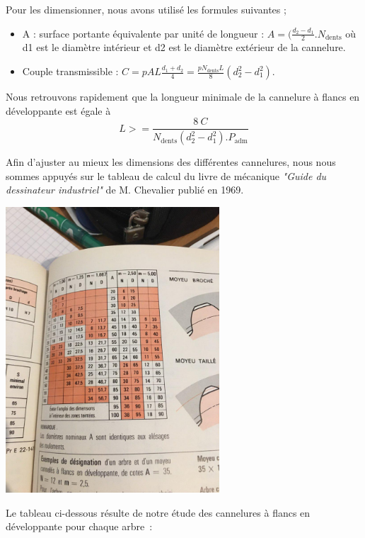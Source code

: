 \documentclass{config}
\begin{document}
\begin{spacing}{1.2}
Pour les dimensionner, nous avons utilisé les formules suivantes ;
\begin{itemize}
    \item A : surface portante équivalente par unité de longueur : $A = (\frac{d_2-d_1}{2}.N_{\textrm{dents}}$ où d1 est le diamètre intérieur et d2 est le diamètre extérieur de la cannelure.
    \item Couple transmissible : $C = p A L \frac{d_1+d_2}{4} = \frac{p N_{\textrm{dents}} L}{8} (d_2^2 - d_1^2)$.
\end{itemize}
Nous retrouvons rapidement que la longueur minimale de la cannelure à flancs en développante est égale à 
\[ L >= \frac{8 ~ C}{N_{\textrm{dents}}(d_2^2 - d_1^2). P_{\textrm{adm}}}\]

Afin d'ajuster au mieux les dimensions des différentes cannelures, nous nous sommes appuyés sur le tableau de calcul du livre de mécanique \textit{"Guide du dessinateur industriel"} de M. Chevalier publié en 1969.

\begin{center}
\includegraphics[width=0.6\textwidth]{guide_dessin_indus_cannelure_dev.jpg}
\end{center}

Le tableau ci-dessous résulte de notre étude des cannelures à flancs en développante pour chaque arbre :


\end{spacing}
\end{document}
